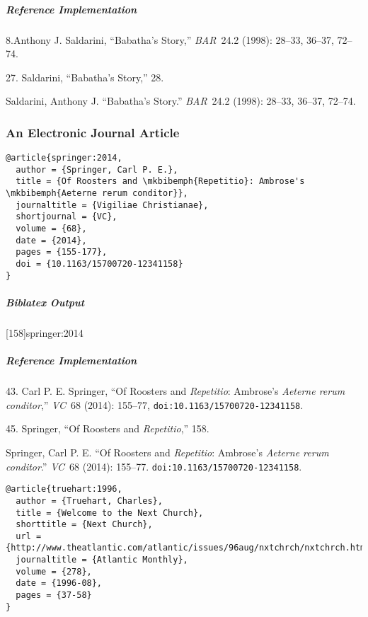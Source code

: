 \documentclass[a4paper]{article}
\newenvironment{biboutput}{%
  \subparagraph{Biblatex Output}
}{\color{black}}
\newenvironment{refimp}{%
  \subparagraph{Reference Implementation}
  \color{reference-colour}
  \rm
}{\par\color{black}}
\begin{document}
\begin{refimp}
  \hspace*{\bibindent}8.Anthony J. Saldarini, “Babatha’s Story,”
  \emph{BAR}~24.2 (1998): 28–33, 36–37, 72–74.

  \hspace*{\bibindent}27. Saldarini, “Babatha’s Story,” 28.

 \hangindent\bibindent Saldarini, Anthony J. “Babatha’s Story.”
 \emph{BAR}~24.2 (1998): 28–33, 36–37, 72–74.

\end{refimp}

\subsubsection{An Electronic Journal Article}

\begin{lstlisting}
@article{springer:2014,
  author = {Springer, Carl P. E.},
  title = {Of Roosters and \mkbibemph{Repetitio}: Ambrose's \mkbibemph{Aeterne rerum conditor}},
  journaltitle = {Vigiliae Christianae},
  shortjournal = {VC},
  volume = {68},
  date = {2014},
  pages = {155-177},
  doi = {10.1163/15700720-12341158}
}
\end{lstlisting}

\begin{biboutput}
  [158]{springer:2014}
\end{biboutput}

\begin{refimp}
  \hspace*{\bibindent}43. Carl P. E. Springer, “Of Roosters and
  \emph{Repetitio}: Ambrose’s \emph{Aeterne rerum conditor},” \emph{VC}~68
  (2014): 155–77, \nolinkurl{doi:10.1163/15700720-12341158}.

  \hspace*{\bibindent}45. Springer, “Of Roosters and \emph{Repetitio},” 158.

  \hangindent\bibindent Springer, Carl P. E. “Of Roosters and
  \emph{Repetitio}: Ambrose’s \emph{Aeterne rerum conditor}.” \emph{VC}~68
  (2014): 155–77. \nolinkurl{doi:10.1163/15700720-12341158}.

\end{refimp}

\begin{lstlisting}
@article{truehart:1996,
  author = {Truehart, Charles},
  title = {Welcome to the Next Church},
  shorttitle = {Next Church},
  url = {http://www.theatlantic.com/atlantic/issues/96aug/nxtchrch/nxtchrch.htm},
  journaltitle = {Atlantic Monthly},
  volume = {278},
  date = {1996-08},
  pages = {37-58}
}
\end{lstlisting}
\end{document}
